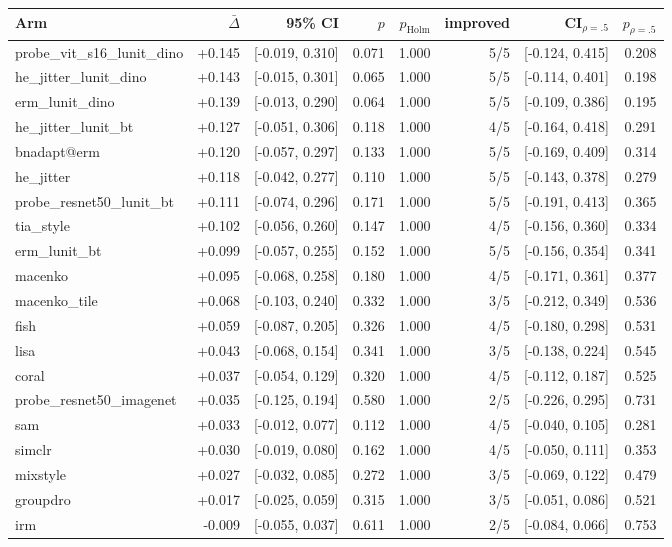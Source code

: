 \begin{tabular}{lrrrrrrr}
\toprule
Arm & $\bar\Delta$ & 95\% CI & $p$ & $p_\text{Holm}$ & improved & CI$_{\rho=.5}$ & $p_{\rho=.5}$ \\
\midrule
probe\_vit\_s16\_lunit\_dino & +0.145 & [-0.019, 0.310] & 0.071 & 1.000 & 5/5 & [-0.124, 0.415] & 0.208 \\
he\_jitter\_lunit\_dino & +0.143 & [-0.015, 0.301] & 0.065 & 1.000 & 5/5 & [-0.114, 0.401] & 0.198 \\
erm\_lunit\_dino & +0.139 & [-0.013, 0.290] & 0.064 & 1.000 & 5/5 & [-0.109, 0.386] & 0.195 \\
he\_jitter\_lunit\_bt & +0.127 & [-0.051, 0.306] & 0.118 & 1.000 & 4/5 & [-0.164, 0.418] & 0.291 \\
bnadapt@erm & +0.120 & [-0.057, 0.297] & 0.133 & 1.000 & 5/5 & [-0.169, 0.409] & 0.314 \\
he\_jitter & +0.118 & [-0.042, 0.277] & 0.110 & 1.000 & 5/5 & [-0.143, 0.378] & 0.279 \\
probe\_resnet50\_lunit\_bt & +0.111 & [-0.074, 0.296] & 0.171 & 1.000 & 5/5 & [-0.191, 0.413] & 0.365 \\
tia\_style & +0.102 & [-0.056, 0.260] & 0.147 & 1.000 & 4/5 & [-0.156, 0.360] & 0.334 \\
erm\_lunit\_bt & +0.099 & [-0.057, 0.255] & 0.152 & 1.000 & 5/5 & [-0.156, 0.354] & 0.341 \\
macenko & +0.095 & [-0.068, 0.258] & 0.180 & 1.000 & 4/5 & [-0.171, 0.361] & 0.377 \\
macenko\_tile & +0.068 & [-0.103, 0.240] & 0.332 & 1.000 & 3/5 & [-0.212, 0.349] & 0.536 \\
fish & +0.059 & [-0.087, 0.205] & 0.326 & 1.000 & 4/5 & [-0.180, 0.298] & 0.531 \\
lisa & +0.043 & [-0.068, 0.154] & 0.341 & 1.000 & 3/5 & [-0.138, 0.224] & 0.545 \\
coral & +0.037 & [-0.054, 0.129] & 0.320 & 1.000 & 4/5 & [-0.112, 0.187] & 0.525 \\
probe\_resnet50\_imagenet & +0.035 & [-0.125, 0.194] & 0.580 & 1.000 & 2/5 & [-0.226, 0.295] & 0.731 \\
sam & +0.033 & [-0.012, 0.077] & 0.112 & 1.000 & 4/5 & [-0.040, 0.105] & 0.281 \\
simclr & +0.030 & [-0.019, 0.080] & 0.162 & 1.000 & 4/5 & [-0.050, 0.111] & 0.353 \\
mixstyle & +0.027 & [-0.032, 0.085] & 0.272 & 1.000 & 3/5 & [-0.069, 0.122] & 0.479 \\
groupdro & +0.017 & [-0.025, 0.059] & 0.315 & 1.000 & 3/5 & [-0.051, 0.086] & 0.521 \\
irm & -0.009 & [-0.055, 0.037] & 0.611 & 1.000 & 2/5 & [-0.084, 0.066] & 0.753 \\
\bottomrule
\end{tabular}
